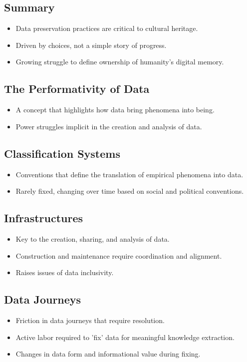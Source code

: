 \documentclass{article}
\begin{document}
\subsection*{Summary}
\begin{itemize}
  \item Data preservation practices are critical to cultural heritage.
  \item Driven by choices, not a simple story of progress.
  \item Growing struggle to define ownership of humanity's digital memory.
\end{itemize}

\subsection*{The Performativity of Data}
\begin{itemize}
  \item A concept that highlights how data bring phenomena into being.
  \item Power struggles implicit in the creation and analysis of data.
\end{itemize}

\subsection*{Classification Systems}
\begin{itemize}
  \item Conventions that define the translation of empirical phenomena into data.
  \item Rarely fixed, changing over time based on social and political conventions.
\end{itemize}

\subsection*{Infrastructures}
\begin{itemize}
  \item Key to the creation, sharing, and analysis of data.
  \item Construction and maintenance require coordination and alignment.
  \item Raises issues of data inclusivity.
\end{itemize}

\subsection*{Data Journeys}
\begin{itemize}
  \item Friction in data journeys that require resolution.
  \item Active labor required to 'fix' data for meaningful knowledge extraction.
  \item Changes in data form and informational value during fixing.
\end{itemize}
\end{document}
